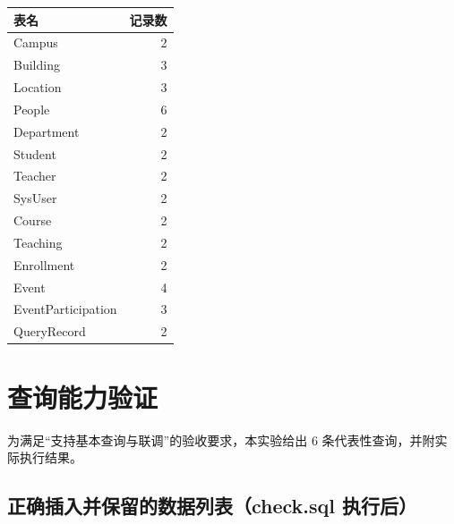 \documentclass[11pt, a4paper]{article}
\begin{document}
\begin{center}
\begin{tabular}{l|r}
\toprule
\textbf{表名} & \textbf{记录数} \\
\midrule
Campus & 2 \\
Building & 3 \\
Location & 3 \\
People & 6 \\
Department & 2 \\
Student & 2 \\
Teacher & 2 \\
SysUser & 2 \\
Course & 2 \\
Teaching & 2 \\
Enrollment & 2 \\
Event & 4 \\
EventParticipation & 3 \\
QueryRecord & 2 \\
\bottomrule
\end{tabular}
\end{center}

\section{查询能力验证}

为满足“支持基本查询与联调”的验收要求，本实验给出 6 条代表性查询，并附实际执行结果。

\subsection{正确插入并保留的数据列表（check.sql 执行后）}
\end{document}
